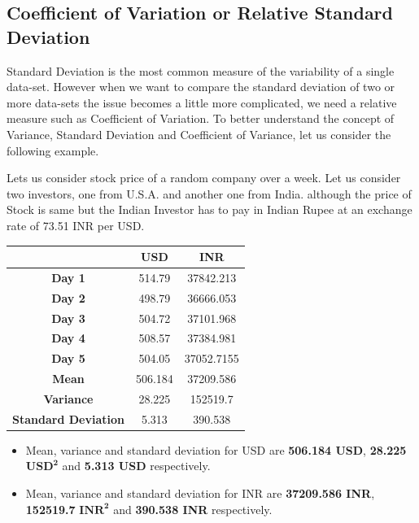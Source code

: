 \documentclass[twoside,12pt]{report}  %
\begin{document}
\subsection{Coefficient of Variation or Relative Standard Deviation}
Standard Deviation is the most common measure of the variability of a single data-set. However when we want to compare the standard deviation of two or more data-sets the issue becomes a little more complicated, we need a relative measure such as Coefficient of Variation.
To better understand the concept of Variance, Standard Deviation and Coefficient of Variance, let us consider the following example. 
\begin{tcolorbox}[colback=blue!5!white, colframe=blue!75!black, title = \textbf{Mean, Variance, Satndard Deviation}]
	Lets us consider stock price of a random company over a week. Let us consider two investors, one from U.S.A. and another one from India. although the price of Stock is same but the Indian Investor has to pay in Indian Rupee at an exchange rate of 73.51 INR per USD. 
	\begin{table}[H]
		\begin{center}
			\begin{tabular} {c|cc}
				&USD	    &INR \\ 
				\hline
				\textbf{Day 1}		                    &514.79		&37842.213	\\ 
				\textbf{Day 2}		                    &498.79		&36666.053  \\
				\textbf{Day 3}		                    &504.72		&37101.968	\\
				\textbf{Day 4}		                    &508.57		&37384.981	\\
				\textbf{Day 5}		                    &504.05		&37052.7155	\\
				\hline 
				\textbf{Mean}		                    &506.184	&37209.586	\\
				\textbf{Variance}		                &28.225		&152519.7	\\
				\textbf{Standard Deviation}		        &5.313		&390.538	\\
			\end{tabular}
		\end{center}
	\end{table}	
	\begin{itemize}
		\item Mean, variance and standard deviation for USD are \textbf{506.184 USD}, \textbf{28.225} $\boldsymbol{USD^2}$ and \textbf{5.313 USD} respectively.
		\item Mean, variance and standard deviation for INR are \textbf{37209.586 INR}, \textbf{152519.7} $\boldsymbol{INR^2}$ and \textbf{390.538 INR} respectively. 
	\end{itemize}
\end{tcolorbox}
\pagebreak
\end{document}
